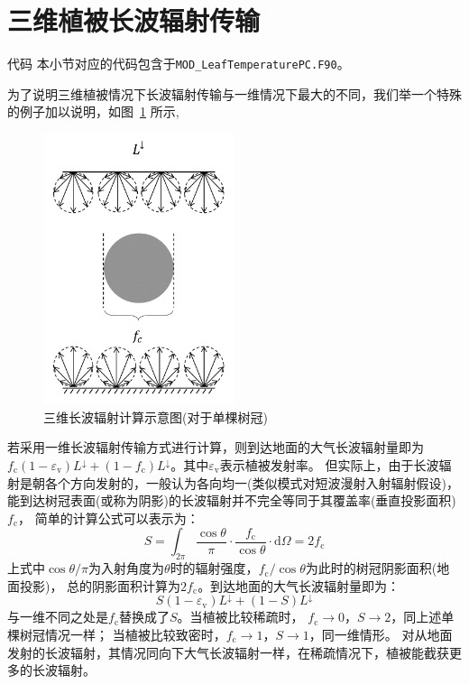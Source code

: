 \section{三维植被长波辐射传输}\label{三维植被长波辐射传输}
\begin{mymdframed}{代码}
  本小节对应的代码包含于\texttt{MOD\_LeafTemperaturePC.F90}。
\end{mymdframed}

为了说明三维植被情况下长波辐射传输与一维情况下最大的不同，我们举一个特殊的例子加以说明，如图~\ref{fig:单棵树冠长波辐射传输示意图} 所示,
{
  \begin{figure}[htb]
    \centering
    \includegraphics[width=0.5\textwidth]{Figures/辐射过程及辐射通量计算/单棵树冠长波辐射传输示意图.png}
    \caption{三维长波辐射计算示意图(对于单棵树冠)}
    \label{fig:单棵树冠长波辐射传输示意图}
  \end{figure}
}
%
若采用一维长波辐射传输方式进行计算，则到达地面的大气长波辐射量即为$f_{\mathrm {c}}\left(1-\varepsilon_{\mathrm v}\right)L^\downarrow+\left(1-f_{\mathrm {c}}\right)L^\downarrow$。其中$\varepsilon_{\mathrm v}$表示植被发射率。
但实际上，由于长波辐射是朝各个方向发射的，一般认为各向均一(类似模式对短波漫射入射辐射假设)，能到达树冠表面(或称为阴影)的长波辐射并不完全等同于其覆盖率(垂直投影面积)$f_{\mathrm {c}}$，
简单的计算公式可以表示为：
\begin{equation}
  S=\int_{2 \pi} \frac{\cos \theta}{\pi} \cdot \frac{f_{\mathrm{c}}}{\cos \theta} \cdot {\mathrm d} \Omega=2 f_{\mathrm{c}}
\end{equation}
上式中$\cos{\theta}/\pi$为入射角度为$\theta$时的辐射强度，$f_{\mathrm {c}}/\cos{\theta}$为此时的树冠阴影面积(地面投影)，
总的阴影面积计算为$2f_{\mathrm {c}}$。到达地面的大气长波辐射量即为：
\begin{equation}
  S\left(1-\varepsilon_{\mathrm{v}}\right) L ^\downarrow+(1-S) L ^\downarrow
\end{equation}
与一维不同之处是$f_{\mathrm {c}}$替换成了$S$。当植被比较稀疏时，
$f_{\mathrm {c}}\rightarrow0$，$S\rightarrow2$，同上述单棵树冠情况一样；
当植被比较致密时，$f_{\mathrm {c}}\rightarrow1$，$S\rightarrow1$，同一维情形。
对从地面发射的长波辐射，其情况同向下大气长波辐射一样，在稀疏情况下，植被能截获更多的长波辐射。

